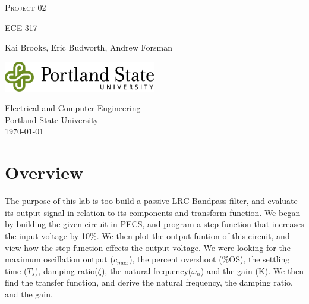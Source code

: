 \documentclass[a4paper,12pt]{article}
\begin{document}

\begin{titlepage}
	\begin{center}
		\vspace*{1cm}

		\huge\textsc{Project 02}

		\vspace{0.5cm}
		\small\textsc{ECE 317}
		
		\vspace{1.5cm}
		\normalsize Kai Brooks, Eric Budworth, Andrew Forsman
		
		\vspace{0.5cm}
		
		\vfill
		\vspace{0.8cm}
		
		\includegraphics[width=0.5\textwidth]{images/psulogo_horiz_msword.png}
		
		\vspace{0.5cm}
		Electrical and Computer Engineering\\
		Portland State University\\
		\today
		 
	\end{center}
\end{titlepage}

\newpage
\tableofcontents


\newpage
{}

\section{Overview}
The purpose of this lab is too build a passive LRC Bandpass filter, and evaluate its output signal in relation to its components and transform function. We began by building the given circuit in PECS, and program a step function that increases the input voltage by 10\%. We then plot the output funtion of this circuit, and view how the step function effects the output voltage. We were looking for the maximum oscillation output ($c_{max}$), the percent overshoot (\%OS), the settling time ($T_s$), damping ratio($\zeta$), the natural frequency($\omega_n$) and the gain (K). We then find the transfer function, and derive the natural frequency, the damping ratio, and the gain.
\end{document}
